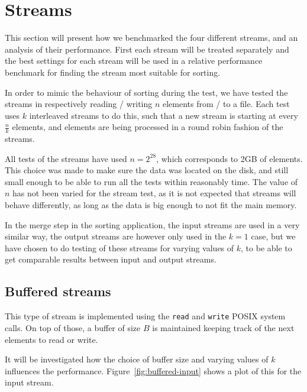\documentclass[a4paper,12pt]{article}
\begin{document}
\section{Streams}
This section will present how we benchmarked the four different
streams, and an analysis of their performance. First each stream will
be treated separately and the best settings for each stream will be
used in a relative performance benchmark for finding the stream most
suitable for sorting.

In order to mimic the behaviour of sorting during the test, we have
tested the streams in respectively reading / writing $n$ elements from
/ to a file. Each test uses $k$ interleaved streams to do this, such
that a new stream is starting at every $\frac{n}{k}$ elements, and
elements are being processed in a round robin fashion of the streams.

All tests of the streams have used $n = 2^{28}$, which corresponds to
2GB of elements. This choice was made to make sure the data was
located on the disk, and still small enough to be able to run all the tests within reasonably time. The
value of $n$ has not been varied for the stream test, as it is not
expected that streams will behave differently, as long as the data is
big enough to not fit the main memory.

In the merge step in the sorting application, the input streams are
used in a very similar way, the output streams are however only used
in the $k = 1$ case, but we have chosen to do testing of these streams
for varying values of $k$, to be able to get comparable results
between input and output streams.

\subsection{Buffered streams}
This type of stream is implemented using the \texttt{read} and
\texttt{write} POSIX system calls. On top of those, a buffer of size
$B$ is maintained keeping track of the next elements to read or write.

It will be investigated how the choice of buffer size and varying
values of $k$ influences the
performance. Figure~\ref{fig:buffered-input} shows a plot of this for
the input stream.
\end{document}
